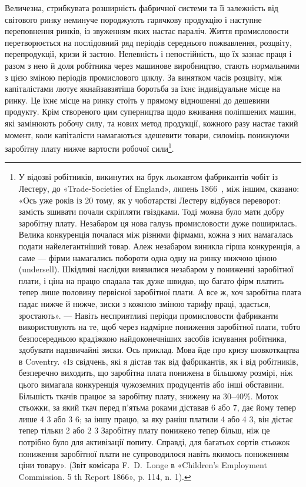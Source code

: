 Величезна, стрибкувата розширність фабричної системи та
її залежність від світового ринку неминуче породжують гарячкову
продукцію і наступне переповнення ринків, із звуженням
яких настає параліч. Життя промисловости перетворюється на
послідовний ряд періодів середнього пожвавлення, розцвіту,
перепродукції, кризи й застою. Непевність і непостійність, що
їх зазнає праця і разом з нею й доля робітника через машинове
виробництво, стають нормальними з цією зміною періодів промислового
циклу. За винятком часів розцвіту, між капіталістами лютує
якнайзавзятіша боротьба за їхнє індивідуальне місце на ринку.
Це їхнє місце на ринку стоїть у прямому відношенні до дешевини
продукту. Крім створеного цим суперництва щодо вживання
поліпшених машин, які замінюють робочу силу, та нових метод
продукції, кожного разу настає такий момент, коли капіталісти
намагаються здешевити товари, силоміць понижуючи заробітну
плату нижче вартости робочої сили\footnote{
У відозві робітників, викинутих на брук льокавтом фабрикантів
чобіт із Лестеру, до «Trade-Societies of England», липень 1866~, між
іншим, сказано: «Ось уже років із 20 тому, як у чоботарстві Лестеру
відбувся переворот: замість зшивати почали скріпляти гвіздками. Тоді
можна було мати добру заробітну плату. Незабаром ця нова галузь промисловости
дуже поширилась. Велика конкуренція почалася між різними
фірмами, кожна з них намагалась подати найелегантніший товар. Алеж
незабаром виникла гірша конкуренція, а саме — фірми намагались побороти
одна одну на ринку нижчою ціною (undersell). Шкідливі наслідки виявилися
незабаром у пониженні заробітної плати, і ціна на працю спадала
так дуже швидко, що багато фірм платить тепер лише половину первісної
заробітної плати. А все ж, хоч заробітна плата падає нижче й нижче,
зиски з кожною зміною тарифу праці, здається, зростають». — Навіть
несприятливі періоди промисловости фабриканти використовують на те,
щоб через надмірне пониження заробітної плати, тобто безпосередньою
крадіжкою найдоконечніших засобів існування робітника, здобувати
надзвичайні зиски. Ось приклад. Мова йде про кризу шовкоткацтва в
Coventry. «Із свідчень, які я дістав так від фабрикантів, як і від робітників,
безперечно виходить, що заробітна плата понижена в більшому розмірі,
ніж цього вимагала конкуренція чужоземних продуцентів або інші обставини.
Більшість ткачів працює за заробітну плату, знижену на 30--40\%.
Моток стьожки, за який ткач перед п’ятьма роками діставав 6 або 7,
дає йому тепер лише 4 3 або 3 6;
за іншу працю, за яку раніш платили 4 або 4 3,
він дістає тепер тільки 2 або 2 3 Заробітну плату
понижено тепер більш, ніж це потрібно було для активізації попиту.
Справді, для багатьох сортів стьожок пониження заробітної плати не
супроводилося навіть якимось пониженням ціни товару». (Звіт комісара
F.~D.~Longe в «Children’s Employment Commission. 5 th Report 1866»,
p. 114, n. 1).
}.



